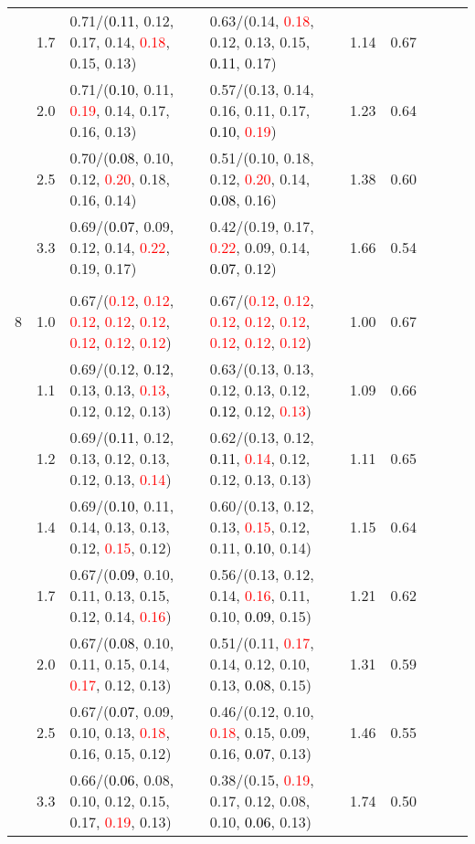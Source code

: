 \documentclass[10pt,a4paper]{report}
\begin{document}
\begin{table}[!htbp]
\begin{center}
{\begin{tabular}{ccllccccc}
			&1.7&0.71/(\textcolor{black}{0.11}, 0.12, 0.17, 0.14, \textcolor{red}{0.18}, 0.15, 0.13)&0.63/(0.14, \textcolor{red}{0.18}, 0.12, 0.13, 0.15, \textcolor{black}{0.11}, 0.17)&1.14&0.67\\
			&2.0&0.71/(\textcolor{black}{0.10}, 0.11, \textcolor{red}{0.19}, 0.14, 0.17, 0.16, 0.13)&0.57/(0.13, 0.14, 0.16, 0.11, 0.17, \textcolor{black}{0.10}, \textcolor{red}{0.19})&1.23&0.64\\
			&2.5&0.70/(\textcolor{black}{0.08}, 0.10, 0.12, \textcolor{red}{0.20}, 0.18, 0.16, 0.14)&0.51/(0.10, 0.18, 0.12, \textcolor{red}{0.20}, 0.14, \textcolor{black}{0.08}, 0.16)&1.38&0.60\\
			&3.3&0.69/(\textcolor{black}{0.07}, 0.09, 0.12, 0.14, \textcolor{red}{0.22}, 0.19, 0.17)&0.42/(0.19, 0.17, \textcolor{red}{0.22}, 0.09, 0.14, \textcolor{black}{0.07}, 0.12)&1.66&0.54\\
			&&&&\\
			8			&1.0&0.67/(\textcolor{red}{0.12}, \textcolor{red}{0.12}, \textcolor{red}{0.12}, \textcolor{red}{0.12}, \textcolor{red}{0.12}, \textcolor{red}{0.12}, \textcolor{red}{0.12}, \textcolor{red}{0.12})&0.67/(\textcolor{red}{0.12}, \textcolor{red}{0.12}, \textcolor{red}{0.12}, \textcolor{red}{0.12}, \textcolor{red}{0.12}, \textcolor{red}{0.12}, \textcolor{red}{0.12}, \textcolor{red}{0.12})&1.00&0.67\\
			&1.1&0.69/(0.12, \textcolor{black}{0.12}, 0.13, 0.13, \textcolor{red}{0.13}, 0.12, 0.12, 0.13)&0.63/(0.13, 0.13, 0.12, 0.13, 0.12, \textcolor{black}{0.12}, 0.12, \textcolor{red}{0.13})&1.09&0.66\\
			&1.2&0.69/(\textcolor{black}{0.11}, 0.12, 0.13, 0.12, 0.13, 0.12, 0.13, \textcolor{red}{0.14})&0.62/(0.13, 0.12, \textcolor{black}{0.11}, \textcolor{red}{0.14}, 0.12, 0.12, 0.13, 0.13)&1.11&0.65\\
			&1.4&0.69/(\textcolor{black}{0.10}, 0.11, 0.14, 0.13, 0.13, 0.12, \textcolor{red}{0.15}, 0.12)&0.60/(0.13, 0.12, 0.13, \textcolor{red}{0.15}, 0.12, 0.11, \textcolor{black}{0.10}, 0.14)&1.15&0.64\\
			&1.7&0.67/(\textcolor{black}{0.09}, 0.10, 0.11, 0.13, 0.15, 0.12, 0.14, \textcolor{red}{0.16})&0.56/(0.13, 0.12, 0.14, \textcolor{red}{0.16}, 0.11, 0.10, \textcolor{black}{0.09}, 0.15)&1.21&0.62\\
			&2.0&0.67/(\textcolor{black}{0.08}, 0.10, 0.11, 0.15, 0.14, \textcolor{red}{0.17}, 0.12, 0.13)&0.51/(0.11, \textcolor{red}{0.17}, 0.14, 0.12, 0.10, 0.13, \textcolor{black}{0.08}, 0.15)&1.31&0.59\\
			&2.5&0.67/(\textcolor{black}{0.07}, 0.09, 0.10, 0.13, \textcolor{red}{0.18}, 0.16, 0.15, 0.12)&0.46/(0.12, 0.10, \textcolor{red}{0.18}, 0.15, 0.09, 0.16, \textcolor{black}{0.07}, 0.13)&1.46&0.55\\
			&3.3&0.66/(\textcolor{black}{0.06}, 0.08, 0.10, 0.12, 0.15, 0.17, \textcolor{red}{0.19}, 0.13)&0.38/(0.15, \textcolor{red}{0.19}, 0.17, 0.12, 0.08, 0.10, \textcolor{black}{0.06}, 0.13)&1.74&0.50\\
			\bottomrule
		\end{tabular}}
	\end{center}
\end{table}
\end{document}
